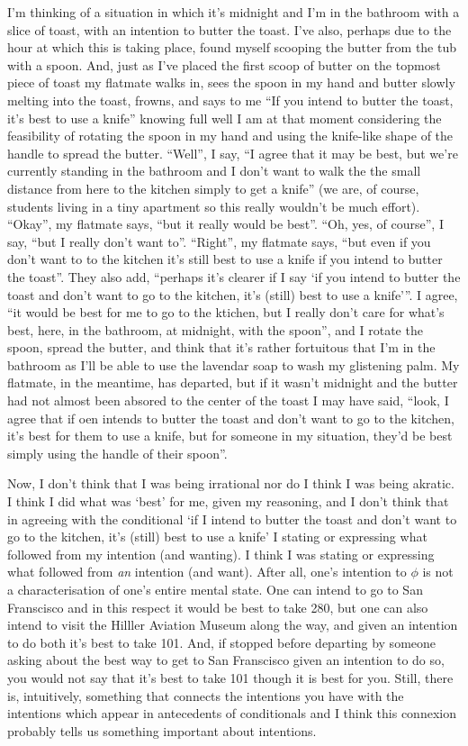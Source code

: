 \documentclass[10pt]{article}
\begin{document}
I'm thinking of a situation in which it's midnight and I'm in the bathroom with a slice of toast, with an intention to butter the toast.
I've also, perhaps due to the hour at which this is taking place, found myself scooping the butter from the tub with a spoon.
And, just as I've placed the first scoop of butter on the topmost piece of toast my flatmate walks in, sees the spoon in my hand and butter slowly melting into the toast, frowns, and says to me ``If you intend to butter the toast, it's best to use a knife'' knowing full well I am at that moment considering the feasibility of rotating the spoon in my hand and using the knife-like shape of the handle to spread the butter.
``Well'', I say, ``I agree that it may be best, but we're currently standing in the bathroom and I don't want to walk the the small distance from here to the kitchen simply to get a knife'' (we are, of course, students living in a tiny apartment so this really wouldn't be much effort).
``Okay'', my flatmate says, ``but it really would be best''.
``Oh, yes, of course'', I say, ``but I really don't want to''.
``Right'', my flatmate says, ``but even if you don't want to to the kitchen it's still best to use a knife if you intend to butter the toast''.
They also add, ``perhaps it's clearer if I say `if you intend to butter the toast and don't want to go to the kitchen, it's (still) best to use a knife'''.
I agree, ``it would be best for me to go to the ktichen, but I really don't care for what's best, here, in the bathroom, at midnight, with the spoon'', and I rotate the spoon, spread the butter, and think that it's rather fortuitous that I'm in the bathroom as I'll be able to use the lavendar soap to wash my glistening palm.
My flatmate, in the meantime, has departed, but if it wasn't midnight and the butter had not almost been absored to the center of the toast I may have said, ``look, I agree that if oen intends to butter the toast and don't want to go to the kitchen, it's best for them to use a knife, but for someone in my situation, they'd be best simply using the handle of their spoon''.

Now, I don't think that I was being irrational nor do I think I was being akratic.
I think I did what was `best' for me, given my reasoning, and I don't think that in agreeing with the conditional `if I intend to butter the toast and don't want to go to the kitchen, it's (still) best to use a knife' I stating or expressing what followed from my intention (and wanting).
I think I was stating or expressing what followed from \emph{an} intention (and want).
After all, one's intention to \(\phi\) is not a characterisation of one's entire mental state.
One can intend to go to San Franscisco and in this respect it would be best to take 280, but one can also intend to visit the Hilller Aviation Museum along the way, and given an intention to do both it's best to take 101.
And, if stopped before departing by someone asking about the best way to get to San Franscisco given an intention to do so, you would not say that it's best to take 101 though it is best for you.
Still, there is, intuitively, something that connects the intentions you have with the intentions which appear in antecedents of conditionals and I think this connexion probably tells us something important about intentions.
\end{document}
